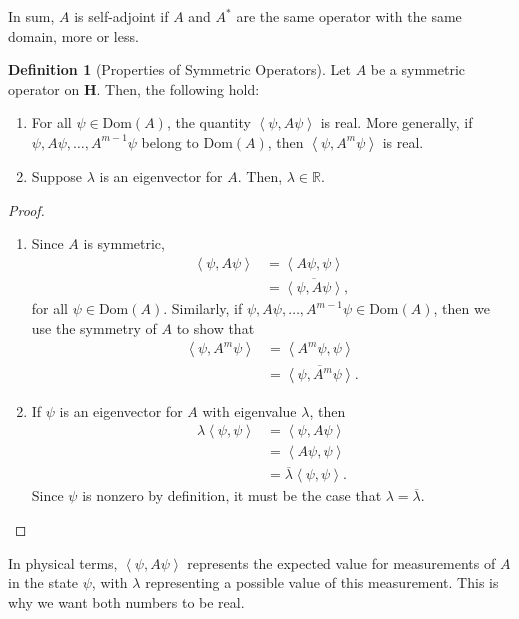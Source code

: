 \documentclass[10pt]{extarticle}
\newcommand{\R}{\mathbb{R}}
\newcommand{\iprod}[2]{\left\langle #1,#2\right\rangle}
\theoremstyle{plain}
\theoremstyle{definition}
\newtheorem*{definition}{Definition}
\theoremstyle{remark}
\renewcommand{\newline}{\hfill\break}
\begin{document}
  In sum, $A$ is self-adjoint if $A$ and $A^{\ast}$ are the same operator with the same domain, more or less.
  \begin{definition}[Properties of Symmetric Operators]
    Let $A$ be a symmetric operator on $\mathbf{H}$. Then, the following hold:
    \begin{enumerate}[(1)]
      \item For all $\psi\in \text{Dom}(A)$, the quantity $\iprod{\psi}{A\psi}$ is real. More generally, if $\psi, A\psi, \dots, A^{m-1}\psi$ belong to $\text{Dom}(A)$, then $\iprod{\psi}{A^{m}\psi}$ is real.
      \item Suppose $\lambda$ is an eigenvector for $A$. Then, $\lambda \in \R$.
    \end{enumerate}
  \end{definition}
  \begin{proof}
    \begin{enumerate}[(1)]
      \item Since $A$ is symmetric,
        \begin{align*}
          \iprod{\psi}{A\psi} &= \iprod{A\psi}{\psi}\\
                              &= \overline{\iprod{\psi}{A\psi}},
        \end{align*}
        for all $\psi \in \text{Dom}(A)$. Similarly, if $\psi,A\psi,\dots,A^{m-1}\psi\in \text{Dom}(A)$, then we use the symmetry of $A$ to show that
        \begin{align*}
          \iprod{\psi}{A^{m}\psi} &= \iprod{A^{m}\psi}{\psi}\\
                                  &= \overline{\iprod{\psi}{A^{m}\psi}}.
        \end{align*}
      \item If $\psi$ is an eigenvector for $A$ with eigenvalue $\lambda$, then
        \begin{align*}
          \lambda \iprod{\psi}{\psi} &= \iprod{\psi}{A\psi}\\
                                     &= \iprod{A\psi}{\psi}\\
                                     &= \overline{\lambda}\iprod{\psi}{\psi}.
        \end{align*}
        Since $\psi$ is nonzero by definition, it must be the case that $\lambda = \overline{\lambda}$.
    \end{enumerate}
  \end{proof}
  In physical terms, $\iprod{\psi}{A\psi}$ represents the expected value for measurements of $A$ in the state $\psi$, with $\lambda$ representing a possible value of this measurement. This is why we want both numbers to be real.\newline
\end{document}
